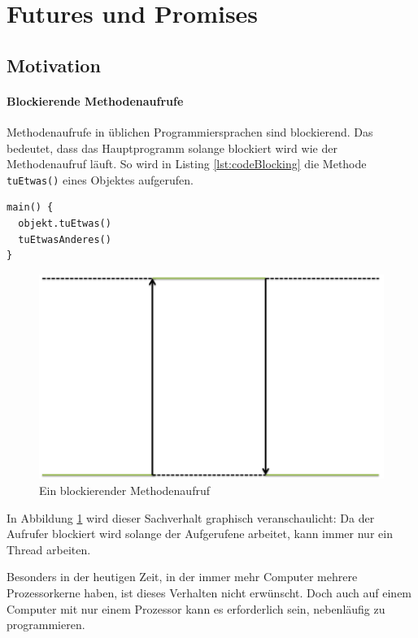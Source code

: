 \section{Futures und Promises}

\subsection{Motivation}

\paragraph{Blockierende Methodenaufrufe} Methodenaufrufe in üblichen Programmiersprachen sind blockierend. Das bedeutet,
dass das Hauptprogramm solange blockiert wird wie der Methodenaufruf läuft.
So wird in Listing \ref{lst:codeBlocking} die Methode \texttt{tuEtwas()} eines Objektes aufgerufen.

\begin{lstlisting}[caption={Blockierender Methodenaufruf},label={lst:codeBlocking},captionpos=b]
main() {
  objekt.tuEtwas()
  tuEtwasAnderes()
}
\end{lstlisting}

\begin{figure}[htbp]
  \centering
	\includegraphics[scale=0.6]{pic/BlockingCall.png}
  \caption{Ein blockierender Methodenaufruf }
  \label{blockingCall}
\end{figure}

In Abbildung \ref{blockingCall} wird dieser Sachverhalt graphisch
veranschaulicht: Da der Aufrufer blockiert wird solange der Aufgerufene
arbeitet, kann immer nur ein Thread arbeiten.

Besonders in der heutigen Zeit, in der immer mehr Computer mehrere
Prozessorkerne haben, ist dieses Verhalten nicht erwünscht. Doch auch
auf einem Computer mit nur einem Prozessor kann es erforderlich sein,
nebenläufig zu programmieren.

